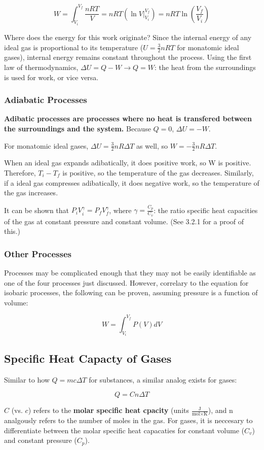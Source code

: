 \documentclass[12pt, a4paper]{article}
\theoremstyle{definition}
\begin{document}
\[W = \int_{V_i}^{V_f} \frac{nRT}{V} = nRT (\ln{V}\Big|_{V_i}^{V_f}) = nRT\ln(\frac{V_f}{V_i})\]

Where does the energy for this work originate?
Since the internal energy of any ideal gas is proportional to its temperature ($U = \frac{3}{2}nRT$ for monatomic ideal gases), internal energy remains constant throughout the process.
Using the first law of thermodynamics, $\Delta U = Q - W \rightarrow Q = W$: the heat from the surroundings is used for work, or vice versa.

\subsubsection{Adiabatic Processes}
\textbf{Adibatic processes are processes where no heat is transfered between the surroundings and the system.}
Because $Q = 0$, $\Delta U = -W$.

For monatomic ideal gases, $\Delta U = \frac{3}{2}nR \Delta T$ as well, so $W = -\frac{3}{2}nR \Delta T$.

When an ideal gas expands adibatically, it does positive work, so W is positive.
Therefore, $T_i - T_f$ is positive, so the temperature of the gas decreases.
Similarly, if a ideal gas compresses adibatically, it does negative work, so the temperature of the gas increases.

It can be shown that $P_i V_i^\gamma = P_f V_f^\gamma$, where $\gamma = \frac{C_p}{C_v}$: the ratio specific heat capacities of the gas at constant pressure and constant volume.
(See 3.2.1 for a proof of this.)

\subsubsection{Other Processes}
Processes may be complicated enough that they may not be easily identifiable as one of the four processes just discussed.
However, correlary to the equation for isobaric processes, the following can be proven, assuming pressure is a function of volume:

\[W = \int_{V_i}^{V_f} P(V)dV\]

\subsection{Specific Heat Capacty of Gases}
Similar to how $Q = mc \Delta T$ for substances, a similar analog exists for gases:

\[Q = Cn\Delta T\]

$C$ (vs. $c$) refers to the \textbf{molar specific heat cpacity} (units $\frac{\textrm{J}}{\textrm{mol} \times \textrm{K}}$), and n analgously refers to the number of moles in the gas.
For gases, it is neccesary to differentiate between the molar specific heat capacaties for constant volume ($C_v$) and constant pressure ($C_p$).
\end{document}
